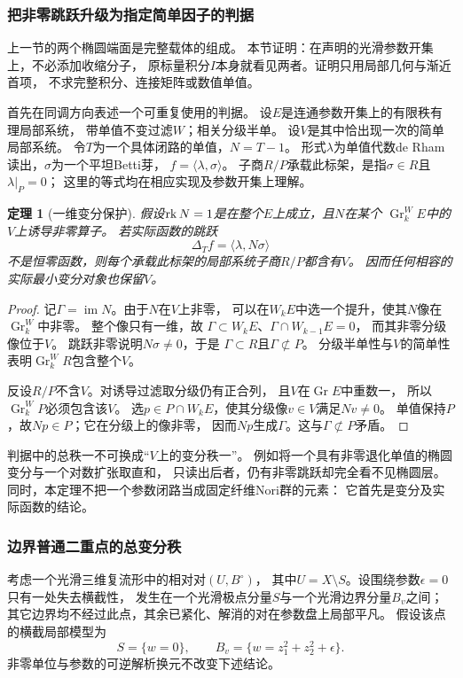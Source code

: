 \documentclass[11pt,a4paper,oneside]{ctexart}
\theoremstyle{cnplain}
\newtheorem{theorem}{定理}[section]
\theoremstyle{definition}
\theoremstyle{remark}
\newcommand{\im}{\operatorname{im}}
\numberwithin{equation}{section}
\begin{document}
\subsubsection{把非零跳跃升级为指定简单因子的判据}
上一节的两个椭圆端面是完整载体的组成。
本节证明：在声明的光滑参数开集上，不必添加收缩分子，
原标量积分$I$本身就看见两者。证明只用局部几何与渐近首项，
不求完整积分、连接矩阵或数值单值。

首先在同调方向表述一个可重复使用的判据。
设$E$是连通参数开集上的有限秩有理局部系统，
带单值不变过滤$W$；相关分级半单。
设$V$是其中恰出现一次的简单局部系统。
令$T$为一个具体闭路的单值，$N=T-1$。
形式$\lambda$为单值代数de Rham读出，$\sigma$为一个平坦Betti芽，
$f=\langle\lambda,\sigma\rangle$。
子商$R/P$承载此标架，是指$\sigma\in R$且$\lambda|_P=0$；
这里的等式均在相应实现及参数开集上理解。

\begin{theorem}[一维变分保护]\label{unified:thm:rankonevisibility}
假设$\operatorname{rk} N=1$是在整个$E$上成立，且$N$在某个
$\operatorname{Gr}^W_kE$中的$V$上诱导非零算子。
若实际函数的跳跃
\[
 \Delta_T f=\langle\lambda,N\sigma\rangle
\]
不是恒零函数，则每个承载此标架的局部系统子商$R/P$都含有$V$。
因而任何相容的实际最小变分对象也保留$V$。
\end{theorem}
\begin{proof}
记$\Gamma=\im N$。由于$N$在$V$上非零，
可以在$W_kE$中选一个提升，使其$N$像在$\operatorname{Gr}_k^W$中非零。
整个像只有一维，故
$\Gamma\subset W_kE$、$\Gamma\cap W_{k-1}E=0$，
而其非零分级像位于$V$。
跳跃非零说明$N\sigma\ne0$，于是
$\Gamma\subset R$且$\Gamma\not\subset P$。
分级半单性与$V$的简单性表明$\operatorname{Gr}_k^WR$包含整个$V$。

反设$R/P$不含$V$。对诱导过滤取分级仍有正合列，
且$V$在$\operatorname{Gr}E$中重数一，
所以$\operatorname{Gr}_k^WP$必须包含该$V$。
选$p\in P\cap W_kE$，使其分级像$v\in V$满足$Nv\ne0$。
单值保持$P$，故$Np\in P$；它在分级上的像非零，
因而$Np$生成$\Gamma$。这与$\Gamma\not\subset P$矛盾。
\end{proof}

判据中的总秩一不可换成“$V$上的变分秩一”。
例如将一个具有非零退化单值的椭圆变分与一个对数扩张取直和，
只读出后者，仍有非零跳跃却完全看不见椭圆层。
同时，本定理不把一个参数闭路当成固定纤维Nori群的元素：
它首先是变分及实际函数的结论。

\subsubsection{边界普通二重点的总变分秩}
考虑一个光滑三维复流形中的相对对$(U,B^\circ)$，
其中$U=X\setminus S$。设围绕参数$\epsilon=0$只有一处失去横截性，
发生在一个光滑极点分量$S$与一个光滑边界分量$B_v$之间；
其它边界均不经过此点，其余已紧化、解消的对在参数盘上局部平凡。
假设该点的横截局部模型为
\begin{equation}\label{unified:eq:boundarypinchmodel}
 S=\{w=0\},\qquad
 B_v=\{w=z_1^2+z_2^2+\epsilon\}.
\end{equation}
非零单位与参数的可逆解析换元不改变下述结论。
\end{document}
